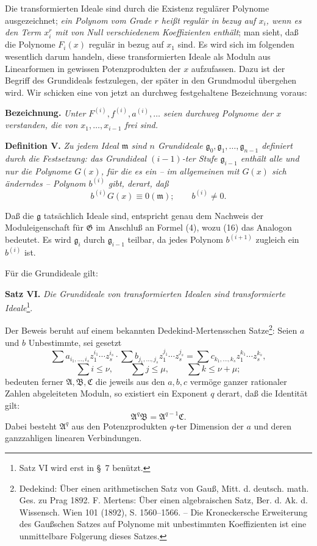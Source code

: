 \documentclass[11pt]{article}
\newcommand{\Amod}{\mathfrak A}
\newcommand{\Bmod}{\mathfrak B}
\newcommand{\Gmod}{\mathfrak G}
\newcommand{\mideal}{\mathfrak m}
\newcommand{\gideal}{\mathfrak g}
\newcommand{\zero}[1]{\equiv 0(#1)}
\begin{document}
Die transformierten Ideale sind durch die Existenz regulärer Polynome ausgezeichnet; \emph{ein Polynom vom Grade $r$ heißt regulär in bezug auf $x_i$, wenn es den Term $x_i^r$ mit von Null verschiedenem Koeffizienten enthält}; man sieht, daß die Polynome $F_i(x)$ regulär in bezug auf $x_1$ sind. Es wird sich im folgenden wesentlich darum handeln, diese transformierten Ideale als Moduln aus Linearformen in gewissen Potenzprodukten der $x$ aufzufassen. Dazu ist der Begriff des Grundideals festzulegen, der später in den Grundmodul übergehen wird. Wir schicken eine von jetzt an durchweg festgehaltene Bezeichnung voraus:

\medskip
\noindent\textbf{Bezeichnung.} \emph{Unter $F^{(i)},f^{(i)},a^{(i)},\ldots$ seien durchweg Polynome der $x$ verstanden, die von $x_1,
\ldots,x_{i-1}$ frei sind.}

\medskip
\noindent\textbf{Definition V.} \emph{Zu jedem Ideal $\mideal$ sind $n$ Grundideale $\gideal_0,\gideal_1,\ldots,\gideal_{n-1}$ definiert durch die Festsetzung: das Grundideal $(i-1)$-ter Stufe $\gideal_{i-1}$ enthält alle und nur die Polynome $G(x)$, für die es ein -- im allgemeinen mit $G(x)$ sich änderndes -- Polynom $b^{(i)}$ gibt, derart, daß}
\begin{equation}
 b^{(i)}G(x)\zero{\mideal};\qquad b^{(i)}\ne0.
\tag{16}
\end{equation}

Daß die $\gideal$ tatsächlich Ideale sind, entspricht genau dem Nachweis der Moduleigenschaft für $\Gmod$ im Anschluß an Formel (4), wozu (16) das Analogon bedeutet. Es wird $\gideal_i$ durch $\gideal_{i-1}$ teilbar, da jedes Polynom $b^{(i+1)}$ zugleich ein $b^{(i)}$ ist.

Für die Grundideale gilt:

\medskip
\noindent\textbf{Satz VI.} \emph{Die Grundideale von transformierten Idealen sind transformierte Ideale}\footnote{Satz VI wird erst in §~7 benützt.}.

Der Beweis beruht auf einem bekannten Dedekind-Mertensschen Satze\footnote{Dedekind: Über einen arithmetischen Satz von Gauß, Mitt. d. deutsch. math. Ges. zu Prag 1892. F. Mertens: Über einen algebraischen Satz, Ber. d. Ak. d. Wissensch. Wien 101 (1892), S. 1560--1566. -- Die Kroneckersche Erweiterung des Gaußschen Satzes auf Polynome mit unbestimmten Koeffizienten ist eine unmittelbare Folgerung dieses Satzes.}: Seien $a$ und $b$ Unbestimmte, sei gesetzt
\[
 \sum a_{i_1,\ldots,i_s}z_1^{i_1}\cdots z_s^{i_s}\cdot
 \sum b_{j_1,\ldots,j_s}z_1^{j_1}\cdots z_s^{j_s}
 =
 \sum c_{k_1,\ldots,k_s}z_1^{k_1}\cdots z_s^{k_s},
\]
\[
 \sum i\le \nu,
 \qquad
 \sum j\le \mu,
 \qquad
 \sum k\le \nu+\mu;
\]
bedeuten ferner $\Amod,\Bmod,\mathfrak C$ die jeweils aus den $a,b,c$ vermöge ganzer rationaler Zahlen abgeleiteten Moduln, so existiert ein Exponent $q$ derart, daß die Identität gilt:
\begin{equation}
 \Amod^q\Bmod=\Amod^{q-1}\mathfrak C.
\tag{17}
\end{equation}
Dabei besteht $\Amod^q$ aus den Potenzprodukten $q$-ter Dimension der $a$ und deren ganzzahligen linearen Verbindungen.
\end{document}
